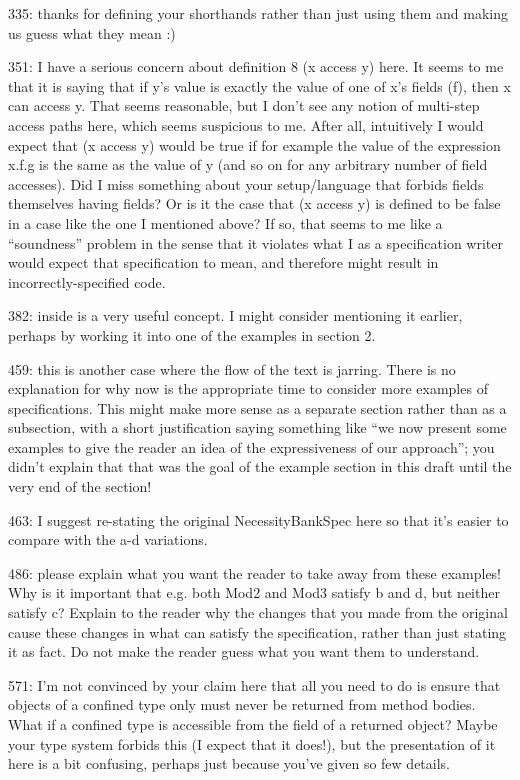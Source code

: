 \documentclass[11pt]{amsart}
\begin{document}
335: thanks for defining your shorthands rather than just using them and making us guess what they mean :)

351: I have a serious concern about definition 8 (x access y) here. It seems to me that it is saying that if y’s value is exactly the value of one of x’s fields (f), then x can access y. That seems reasonable, but I don’t see any notion of multi-step access paths here, which seems suspicious to me. After all, intuitively I would expect that (x access y) would be true if for example the value of the expression x.f.g is the same as the value of y (and so on for any arbitrary number of field accesses). Did I miss something about your setup/language that forbids fields themselves having fields? Or is it the case that (x access y) is defined to be false in a case like the one I mentioned above? If so, that seems to me like a “soundness” problem in the sense that it violates what I as a specification writer would expect that specification to mean, and therefore might result in incorrectly-specified code.

382: inside is a very useful concept. I might consider mentioning it earlier, perhaps by working it into one of the examples in section 2.

459: this is another case where the flow of the text is jarring. There is no explanation for why now is the appropriate time to consider more examples of specifications. This might make more sense as a separate section rather than as a subsection, with a short justification saying something like “we now present some examples to give the reader an idea of the expressiveness of our approach”; you didn’t explain that that was the goal of the example section in this draft until the very end of the section!

463: I suggest re-stating the original NecessityBankSpec here so that it’s easier to compare with the a-d variations.

486: please explain what you want the reader to take away from these examples! Why is it important that e.g. both Mod2 and Mod3 satisfy b and d, but neither satisfy c? Explain to the reader why the changes that you made from the original cause these changes in what can satisfy the specification, rather than just stating it as fact. Do not make the reader guess what you want them to understand.

571: I’m not convinced by your claim here that all you need to do is ensure that objects of a confined type only must never be returned from method bodies. What if a confined type is accessible from the field of a returned object? Maybe your type system forbids this (I expect that it does!), but the presentation of it here is a bit confusing, perhaps just because you’ve given so few details.
\end{document}
